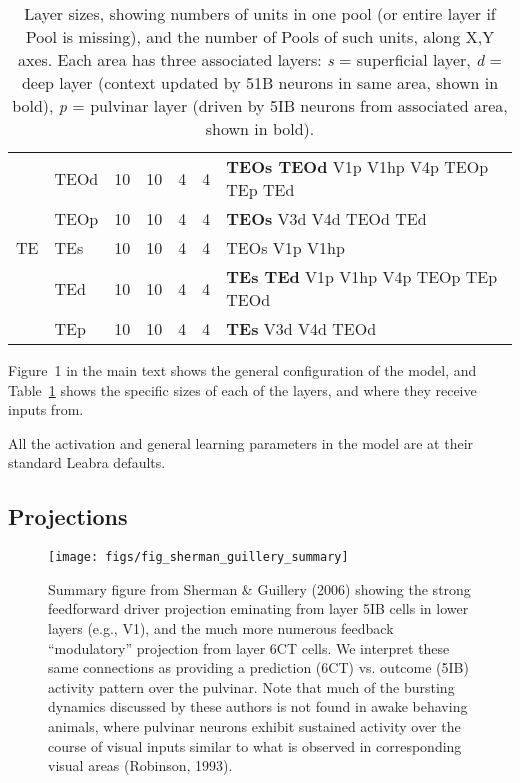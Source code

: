 \documentclass[12pt,twoside]{article}
\newif\myifpdf
\begin{document}
\begin{table}
\begin{tabular}{llrrlll}
   & TEOd & 10 & 10 & 4 & 4 & {\bf TEOs TEOd} V1p V1hp V4p TEOp TEp TEd \\
   & TEOp & 10 & 10 & 4 & 4 & {\bf TEOs} V3d V4d TEOd TEd \\
TE & TEs & 10 & 10 & 4 & 4 & TEOs V1p V1hp \\
   & TEd & 10 & 10 & 4 & 4 & {\bf TEs TEd} V1p V1hp V4p TEOp TEp TEOd \\
   & TEp & 10 & 10 & 4 & 4 & {\bf TEs} V3d V4d TEOd \\
\hline
\end{tabular}
\caption{Layer sizes, showing numbers of units in one pool (or entire layer if Pool is missing), and the number of Pools of such units, along X,Y axes.  Each area has three associated layers: {\em s} = superficial layer, {\em d} = deep layer (context updated by 51B neurons in same area, shown in bold), {\em p} = pulvinar layer (driven by 5IB neurons from associated area, shown in bold).}
\label{tab.layer_sizes}
\end{table}

Figure~1 in the main text shows the general configuration of the model, and Table~\ref{tab.layer_sizes} shows the specific sizes of each of the layers, and where they receive inputs from. 

All the activation and general learning parameters in the model are at their standard Leabra defaults.

\subsection{Projections}

\begin{figure}
  \centering\texttt{[image: figs/fig\_sherman\_guillery\_summary]}
  \caption{Summary figure from Sherman \& Guillery (2006) showing the strong feedforward driver projection eminating from layer 5IB cells in lower layers (e.g., V1), and the much more numerous feedback ``modulatory'' projection from layer 6CT cells.  We interpret these same connections as providing a prediction (6CT) vs. outcome (5IB) activity pattern over the pulvinar.  Note that much of the bursting dynamics discussed by these authors is not found in awake behaving animals, where pulvinar neurons exhibit sustained activity over the course of visual inputs similar to what is observed in corresponding visual areas (Robinson, 1993).}
  \label{fig.sandg}
\end{figure}
\end{document}
